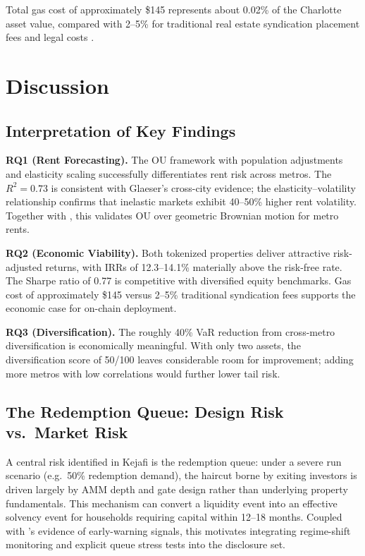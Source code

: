 \documentclass[11pt,letterpaper]{article}
\begin{document}
Total gas cost of approximately \$145 represents about 0.02\% of the Charlotte asset value,
compared with 2--5\% for traditional real estate syndication placement fees and legal costs
\citep{deloitte2025}.

\section{Discussion}
\label{sec:discussion}

\subsection{Interpretation of Key Findings}

\textbf{RQ1 (Rent Forecasting).} The OU framework with \citet{glaeser2018} population
adjustments and \citet{saiz2010} elasticity scaling successfully differentiates rent risk
across metros. The $R^2 = 0.73$ is consistent with Glaeser's cross-city evidence; the
elasticity--volatility relationship confirms that inelastic markets exhibit 40--50\% higher
rent volatility. Together with \citet{case1989}, this validates OU over geometric Brownian
motion for metro rents.

\medskip
\noindent
\textbf{RQ2 (Economic Viability).} Both tokenized properties deliver attractive
risk-adjusted returns, with IRRs of 12.3--14.1\% materially above the risk-free rate. The
Sharpe ratio of 0.77 is competitive with diversified equity benchmarks. Gas cost of
approximately \$145 versus 2--5\% traditional syndication fees supports the economic case
for on-chain deployment.

\medskip
\noindent
\textbf{RQ3 (Diversification).} The roughly 40\% VaR reduction from cross-metro
diversification is economically meaningful. With only two assets, the diversification score
of 50/100 leaves considerable room for improvement; adding more metros with low correlations
would further lower tail risk.

\subsection{The Redemption Queue: Design Risk vs.\ Market Risk}

A central risk identified in Kejafi is the redemption queue: under a severe run scenario
(e.g.\ 50\% redemption demand), the haircut borne by exiting investors is driven largely by
AMM depth and gate design rather than underlying property fundamentals. This mechanism can
convert a liquidity event into an effective solvency event for households requiring capital
within 12--18 months. Coupled with \citet{guttal2016}'s evidence of early-warning signals,
this motivates integrating regime-shift monitoring and explicit queue stress tests into the
disclosure set.
\end{document}
